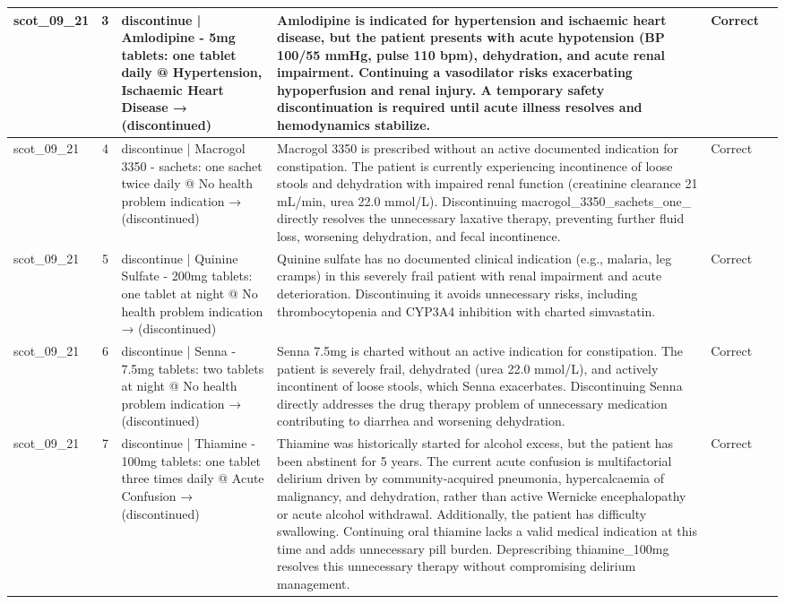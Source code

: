 \begin{longtable}{|p{1.45cm}|c|p{3.3cm}|p{6.5cm}|p{1.55cm}|p{2.3cm}|}
\hline
scot\_09\_21 & 3 & discontinue | Amlodipine - 5mg tablets: one tablet daily @ Hypertension, Ischaemic Heart Disease → (discontinued) & Amlodipine is indicated for hypertension and ischaemic heart disease, but the patient presents with acute hypotension (BP 100/55 mmHg, pulse 110 bpm), dehydration, and acute renal impairment. Continuing a vasodilator risks exacerbating hypoperfusion and renal injury. A temporary safety discontinuation is required until acute illness resolves and hemodynamics stabilize. & Correct &  \\
\hline
scot\_09\_21 & 4 & discontinue | Macrogol 3350 - sachets: one sachet twice daily @ No health problem indication → (discontinued) & Macrogol 3350 is prescribed without an active documented indication for constipation. The patient is currently experiencing incontinence of loose stools and dehydration with impaired renal function (creatinine clearance 21 mL/min, urea 22.0 mmol/L). Discontinuing macrogol\_3350\_sachets\_one\_ directly resolves the unnecessary laxative therapy, preventing further fluid loss, worsening dehydration, and fecal incontinence. & Correct &  \\
\hline
scot\_09\_21 & 5 & discontinue | Quinine Sulfate - 200mg tablets: one tablet at night @ No health problem indication → (discontinued) & Quinine sulfate has no documented clinical indication (e.g., malaria, leg cramps) in this severely frail patient with renal impairment and acute deterioration. Discontinuing it avoids unnecessary risks, including thrombocytopenia and CYP3A4 inhibition with charted simvastatin. & Correct &  \\
\hline
scot\_09\_21 & 6 & discontinue | Senna - 7.5mg tablets: two tablets at night @ No health problem indication → (discontinued) & Senna 7.5mg is charted without an active indication for constipation. The patient is severely frail, dehydrated (urea 22.0 mmol/L), and actively incontinent of loose stools, which Senna exacerbates. Discontinuing Senna directly addresses the drug therapy problem of unnecessary medication contributing to diarrhea and worsening dehydration. & Correct &  \\
\hline
scot\_09\_21 & 7 & discontinue | Thiamine - 100mg tablets: one tablet three times daily @ Acute Confusion → (discontinued) & Thiamine was historically started for alcohol excess, but the patient has been abstinent for 5 years. The current acute confusion is multifactorial delirium driven by community-acquired pneumonia, hypercalcaemia of malignancy, and dehydration, rather than active Wernicke encephalopathy or acute alcohol withdrawal. Additionally, the patient has difficulty swallowing. Continuing oral thiamine lacks a valid medical indication at this time and adds unnecessary pill burden. Deprescribing thiamine\_100mg resolves this unnecessary therapy without compromising delirium management. & Correct &  \\

\end{longtable}
